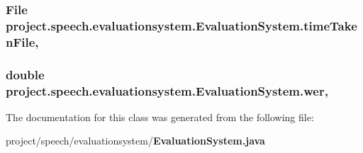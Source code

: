 \subsubsection[{time\+Taken\+File}]{\setlength{\rightskip}{0pt plus 5cm}File project.\+speech.\+evaluationsystem.\+Evaluation\+System.\+time\+Taken\+File\hspace{0.3cm}{\ttfamily [static]}, {\ttfamily [private]}}\label{classproject_1_1speech_1_1evaluationsystem_1_1_evaluation_system_a50fb70d5f996704fc8d75d3f4574145d}
\subsubsection[{wer}]{\setlength{\rightskip}{0pt plus 5cm}double project.\+speech.\+evaluationsystem.\+Evaluation\+System.\+wer\hspace{0.3cm}{\ttfamily [static]}, {\ttfamily [private]}}\label{classproject_1_1speech_1_1evaluationsystem_1_1_evaluation_system_a90b99fea095474bfb0ba8e39eb14da1b}


The documentation for this class was generated from the following file\+:\begin{DoxyCompactItemize}
\item 
project/speech/evaluationsystem/{\bf Evaluation\+System.\+java}\end{DoxyCompactItemize}
